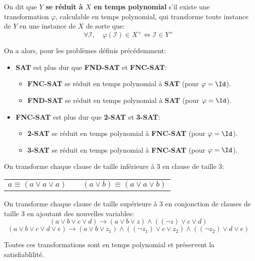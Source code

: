 \documentclass{scrartcl}
\begin{document}
		 On dit que \textbf{$Y$ se réduit à $X$ en temps polynomial} s'il existe une transformation $\varphi$,
		calculable en temps polynomial, qui transforme toute instance de $Y$ en une instance de $X$ de sorte que:
		\[
			\forall \mathcal{I}, \quad \varphi(\mathcal{I}) \in X^+ \Leftrightarrow \mathcal{I} \in Y^+
		\]
		
		On a alors, pour les problèmes définis précédemment:
		\begin{itemize}
			\item \textbf{SAT} est plus dur que \textbf{FND-SAT} et \textbf{FNC-SAT}:
			\begin{itemize}
				\item \textbf{FNC-SAT} se réduit en temps polynomial à \textbf{SAT} (pour $\varphi = \Id$).
				\item \textbf{FND-SAT} se réduit en temps polynomial à \textbf{SAT} (pour $\varphi = \Id$).
			\end{itemize}
			\item \textbf{FNC-SAT} est plus dur que \textbf{2-SAT} et \textbf{3-SAT}:
			\begin{itemize}
				\item \textbf{2-SAT} se réduit en temps polynomial à \textbf{FNC-SAT} (pour $\varphi = \Id$).
				\item \textbf{3-SAT} se réduit en temps polynomial à \textbf{FNC-SAT} (pour $\varphi = \Id$).
			\end{itemize}
		\end{itemize}

		\begin{demo}
			\item On transforme chaque clause de taille inférieure à 3 en clause de taille 3:
			\begin{center}\begin{tabular}{c c c}
				$a \equiv (a \vee a \vee a)$ & \quad & $(a \vee b) \equiv (a \vee a \vee b)$
			\end{tabular}\end{center}
			\item On transforme chaque clause de taille supérieure à 3 en conjonction de clauses de taille 3 en ajoutant des nouvelles variables:
			\[
				(a \vee b \vee c \vee d) \longrightarrow (a \vee b \vee z) \wedge ((\neg z) \vee c \vee d) 
			\]
			\[
				(a \vee b \vee c \vee d \vee e) \longrightarrow (a \vee b \vee z_1) \wedge ((\neg z_1) \vee c \vee z_2) \wedge ((\neg z_2) \vee d \vee e) 
			\]
			\item Toutes ces transformations sont en temps polynomial et préservent la satisfiablilité.
		\end{demo}
\end{document}
